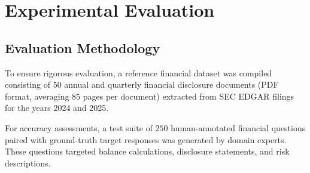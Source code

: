 \documentclass[11pt,journal,onecolumn]{article}
\begin{document}
\begin{table}[htbp]
\centering
{}
\caption{System Comparison: FidelityRAG vs. Alternative Frameworks.}
\label{tab:comparison}
\end{table}

\section{Experimental Evaluation}

\subsection{Evaluation Methodology}
To ensure rigorous evaluation, a reference financial dataset was compiled consisting of $50$ annual and quarterly financial disclosure documents (PDF format, averaging $85$ pages per document) extracted from SEC EDGAR filings for the years 2024 and 2025. 

For accuracy assessments, a test suite of $250$ human-annotated financial questions paired with ground-truth target responses was generated by domain experts. These questions targeted balance calculations, disclosure statements, and risk descriptions. 
\end{document}
